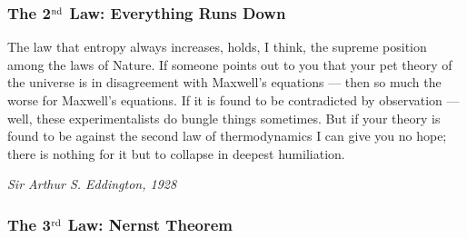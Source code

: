 \subsubsection{The 2$^{\rm nd}$ Law: Everything Runs Down}

\epigraph{The law that entropy always increases, holds, I think, the supreme position among the laws of Nature. If someone points out to you that your pet theory of the universe is in disagreement with Maxwell's equations --- then so much the worse for Maxwell's equations. If it is found to be contradicted by observation --- well, these experimentalists do bungle things sometimes. But if your theory is found to be against the second law of thermodynamics I can give you no hope; there is nothing for it but to collapse in deepest humiliation.}
{\textit{Sir Arthur S. Eddington, 1928}}

\subsubsection{The 3$^{\rm rd}$ Law: Nernst Theorem}



